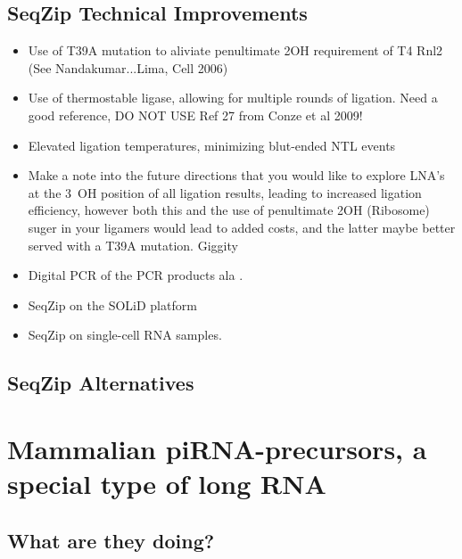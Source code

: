 \subsection{SeqZip Technical Improvements}

\begin{itemize}
	\item Use of T39A mutation to aliviate penultimate 2\textprime OH requirement of T4 Rnl2 (See Nandakumar...Lima, Cell 2006)
	\item Use of thermostable ligase, allowing for multiple rounds of ligation. Need a good reference, DO NOT USE Ref 27 from Conze et al 2009!
	\item Elevated ligation temperatures, minimizing blut-ended NTL events
	\item Make a note into the future directions that you would like to explore LNA’s at the 3\textprime~OH position of all ligation results, leading to increased ligation efficiency, however both this and the use of penultimate 2\textprime OH (Ribosome) suger in your ligamers would lead to added costs, and the latter maybe better served with a T39A mutation. Giggity  
	\item Digital PCR of the PCR products ala \citep{Shiroguchi2012a}. 
	\item SeqZip on the SOLiD platform
	\item SeqZip on single-cell RNA samples.  
\end{itemize}

\subsection{SeqZip Alternatives}
\section{Mammalian piRNA-precursors, a special type of long RNA}



\subsection{What are they doing?}

